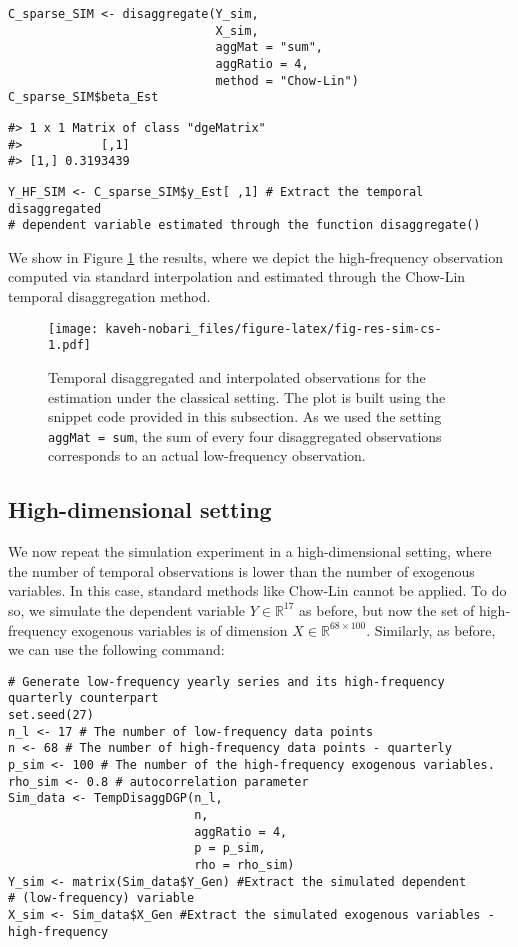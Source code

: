 \begin{verbatim}
C_sparse_SIM <- disaggregate(Y_sim, 
                             X_sim,
                             aggMat = "sum",
                             aggRatio = 4,
                             method = "Chow-Lin")
C_sparse_SIM$beta_Est
\end{verbatim}

\begin{verbatim}
#> 1 x 1 Matrix of class "dgeMatrix"
#>           [,1]
#> [1,] 0.3193439
\end{verbatim}

\begin{verbatim}
Y_HF_SIM <- C_sparse_SIM$y_Est[ ,1] # Extract the temporal disaggregated 
# dependent variable estimated through the function disaggregate()
\end{verbatim}

We show in Figure \ref{fig:fig-res-sim-cs} the results, where we depict the high-frequency observation computed via standard interpolation and estimated through the Chow-Lin temporal disaggregation method.

\begin{figure}
\centering
\texttt{[image: kaveh-nobari\_files/figure-latex/fig-res-sim-cs-1.pdf]}
\caption{\label{fig:fig-res-sim-cs}Temporal disaggregated and interpolated observations for the estimation under the classical setting. The plot is built using the snippet code provided in this subsection. As we used the setting \texttt{aggMat\ =\ sum}, the sum of every four disaggregated observations corresponds to an actual low-frequency observation.}
\end{figure}

\hypertarget{high-dimensional-setting}{%
\subsection{High-dimensional setting}\label{high-dimensional-setting}}

We now repeat the simulation experiment in a high-dimensional setting, where the number of temporal observations is lower than the number of exogenous variables. In this case, standard methods like Chow-Lin cannot be applied.
To do so, we simulate the dependent variable \(Y\in \mathbb{R}^{17}\) as before, but now the set of high-frequency exogenous variables is of dimension \(X \in \mathbb{R}^{68\times 100}\). Similarly, as before, we can use the following command:

\begin{verbatim}
# Generate low-frequency yearly series and its high-frequency quarterly counterpart
set.seed(27)
n_l <- 17 # The number of low-frequency data points 
n <- 68 # The number of high-frequency data points - quarterly
p_sim <- 100 # The number of the high-frequency exogenous variables.
rho_sim <- 0.8 # autocorrelation parameter
Sim_data <- TempDisaggDGP(n_l,
                          n,
                          aggRatio = 4,
                          p = p_sim,
                          rho = rho_sim)
Y_sim <- matrix(Sim_data$Y_Gen) #Extract the simulated dependent 
# (low-frequency) variable
X_sim <- Sim_data$X_Gen #Extract the simulated exogenous variables - high-frequency
\end{verbatim}

